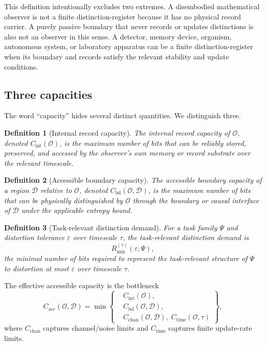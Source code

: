 \documentclass[10pt,a4paper,twocolumn,aps,prl]{revtex4-2}
\newtheorem{definition}{Definition}
\newcommand{\Obs}{\mathcal{O}}
\newcommand{\Patch}{\mathcal{D}}
\begin{document}
This definition intentionally excludes two extremes. A disembodied mathematical observer is not a finite distinction-register because it has no physical record carrier. A purely passive boundary that never records or updates distinctions is also not an observer in this sense. A detector, memory device, organism, autonomous system, or laboratory apparatus can be a finite distinction-register when its boundary and records satisfy the relevant stability and update conditions.

\subsection{Three capacities}

The word ``capacity'' hides several distinct quantities. We distinguish three.

\begin{definition}[Internal record capacity]
The internal record capacity of $\Obs$, denoted $C_{\mathrm{int}}(\Obs)$, is the maximum number of bits that can be reliably stored, preserved, and accessed by the observer's own memory or record substrate over the relevant timescale.
\end{definition}

\begin{definition}[Accessible boundary capacity]
The accessible boundary capacity of a region $\Patch$ relative to $\Obs$, denoted $C_{\mathrm{bd}}(\Obs,\Patch)$, is the maximum number of bits that can be physically distinguished by $\Obs$ through the boundary or causal interface of $\Patch$ under the applicable entropy bound.
\end{definition}

\begin{definition}[Task-relevant distinction demand]
For a task family $\Psi$ and distortion tolerance $\varepsilon$ over timescale $\tau$, the task-relevant distinction demand is
\begin{equation}
R_{\min}^{(\tau)}(\varepsilon;\Psi),
\end{equation}
the minimal number of bits required to represent the task-relevant structure of $\Psi$ to distortion at most $\varepsilon$ over timescale $\tau$.
\end{definition}

The effective accessible capacity is the bottleneck
\begin{equation}
C_{\mathrm{acc}}(\Obs,\Patch)=\min\left\{
\begin{aligned}
&C_{\mathrm{int}}(\Obs),\\
&C_{\mathrm{bd}}(\Obs,\Patch),\\
&C_{\mathrm{chan}}(\Obs,\Patch),\;C_{\mathrm{time}}(\Obs,\tau)
\end{aligned}
\right\},
\label{eq:accessible-capacity}
\end{equation}
where $C_{\mathrm{chan}}$ captures channel/noise limits and $C_{\mathrm{time}}$ captures finite update-rate limits.
\end{document}

